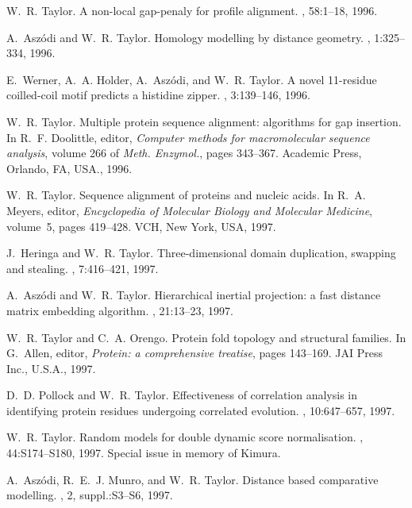 \begin{thebibliography}{100}
W.~R. Taylor.
\newblock A non-local gap-penaly for profile alignment.
, 58:1--18, 1996.

A.~Asz\'{o}di and W.~R. Taylor.
\newblock Homology modelling by distance geometry.
, 1:325--334, 1996.

E.~Werner, A.~A. Holder, A.~Asz\'{o}di, and W.~R. Taylor.
\newblock A novel 11-residue coilled-coil motif predicts a histidine zipper.
, 3:139--146, 1996.

W.~R. Taylor.
\newblock Multiple protein sequence alignment: algorithms for gap insertion.
\newblock In R.~F. Doolittle, editor, {\em Computer methods for macromolecular
  sequence analysis}, volume 266 of {\em Meth. Enzymol.}, pages 343--367.
  Academic Press, Orlando, FA, USA., 1996.

W.~R. Taylor.
\newblock Sequence alignment of proteins and nucleic acids.
\newblock In R.~A. Meyers, editor, {\em Encyclopedia of Molecular Biology and
  Molecular Medicine}, volume~5, pages 419--428. VCH, New York, USA, 1997.

J.~Heringa and W.~R. Taylor.
\newblock Three-dimensional domain duplication, swapping and stealing.
, 7:416--421, 1997.

A.~Asz\'{o}di and W.~R. Taylor.
\newblock Hierarchical inertial projection: a fast distance matrix embedding
  algorithm.
, 21:13--23, 1997.

W.~R. Taylor and C.~A. Orengo.
\newblock Protein fold topology and structural families.
\newblock In G.~Allen, editor, {\em Protein: a comprehensive treatise}, pages
  143--169. JAI Press Inc., U.S.A., 1997.

D.~D. Pollock and W.~R. Taylor.
\newblock Effectiveness of correlation analysis in identifying protein residues
  undergoing correlated evolution.
, 10:647--657, 1997.

W.~R. Taylor.
\newblock Random models for double dynamic score normalisation.
, 44:S174--S180, 1997.
\newblock Special issue in memory of Kimura.

A.~Asz\'{o}di, R.~E.~J. Munro, and W.~R. Taylor.
\newblock Distance based comparative modelling.
, 2, suppl.:S3--S6, 1997.


\end{thebibliography}
